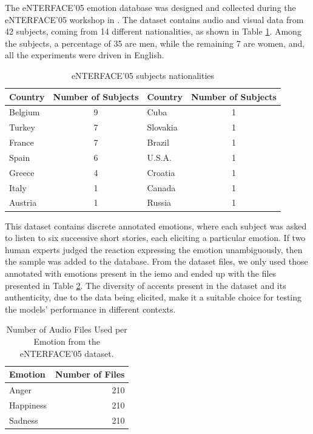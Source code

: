 The eNTERFACE’05 emotion database \cite{Martin2006} was designed and collected during the eNTERFACE’05 workshop in \citeyear{Martin2006}. The dataset contains audio and visual data from 42 subjects, coming from 14 different nationalities, as shown in Table \ref{tab:enterfaceDiversity}. Among the subjects, a percentage of 35 are men, while the remaining 7 are women, and, all the experiments were driven in English.

\begin{table}[H]
	\centering
	\caption{eNTERFACE'05 subjects nationalities}
	\label{tab:enterfaceDiversity}
	\begin{tabular}{lc|lc}
		\toprule
		Country &Number of Subjects &Country &Number of Subjects\\
		\midrule
		Belgium & 9 & Cuba     & 1\\
		Turkey  & 7 & Slovakia & 1\\
		France  & 7 & Brazil   & 1\\
		Spain   & 6 & U.S.A.   & 1\\
		Greece  & 4 & Croatia  & 1\\
		Italy   & 1 & Canada   & 1\\
		Austria & 1 & Russia   & 1\\
		\bottomrule
	\end{tabular}
\end{table}


This dataset contains discrete annotated emotions, where each subject was asked to listen to six successive short stories, each eliciting a particular emotion. If two human experts judged the reaction expressing the emotion unambiguously, then the sample was added to the database.  From the dataset files, we only used those annotated with emotions present in the \ac{iemo} and ended up with the files presented in Table \ref{tab:ent_files}. The diversity of accents present in the dataset and its authenticity, due to the data being elicited, make it a suitable choice for testing the models' performance in different contexts.

\begin{table}[H]
	\centering
	\label{tab:ent_files}
	\caption{Number of Audio Files Used per Emotion from the eNTERFACE'05 dataset.}
	\begin{tabular}{lr}
		\toprule
		Emotion     &   Number of Files \\
		\midrule
		Anger      	&               210 \\
		Happiness 	&               210 \\
		Sadness    	&               210 \\
		\bottomrule
	\end{tabular}
\end{table}

